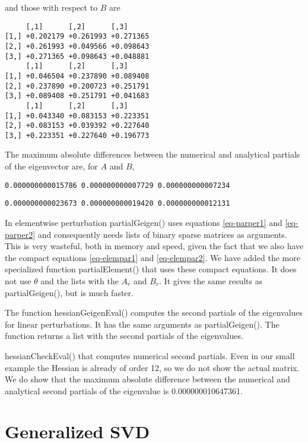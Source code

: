 \documentclass[
  12pt,
  letterpaper,
  DIV=11,
  numbers=noendperiod]{scrartcl}
\newcommand{\sectionbreak}{\clearpage}
\begin{document}
and those with respect to \(B\) are

\begin{verbatim}
     [,1]      [,2]      [,3]     
[1,] +0.202179 +0.261993 +0.271365
[2,] +0.261993 +0.049566 +0.098643
[3,] +0.271365 +0.098643 +0.048881
     [,1]      [,2]      [,3]     
[1,] +0.046504 +0.237890 +0.089408
[2,] +0.237890 +0.200723 +0.251791
[3,] +0.089408 +0.251791 +0.041683
     [,1]      [,2]      [,3]     
[1,] +0.043340 +0.083153 +0.223351
[2,] +0.083153 +0.039392 +0.227640
[3,] +0.223351 +0.227640 +0.196773
\end{verbatim}

The maximum absolute differences between the numerical and analytical
partials of the eigenvector are, for \(A\) and \(B\),

\begin{verbatim}
0.000000000015786 0.000000000007729 0.000000000007234 
\end{verbatim}

\begin{verbatim}
0.000000000023673 0.000000000019420 0.000000000012131 
\end{verbatim}

In elementwise perturbation partialGeigen() uses equations
\eqref{eq-parper1} and \eqref{eq-parper2} and consequently needs lists
of binary sparse matrices as arguments. This is very wasteful, both in
memory and speed, given the fact that we also have the compact equations
\eqref{eq-elempar1} and \eqref{eq-elempar2}. We have added the more
specialized function partialElement() that uses these compact equations.
It does not use \(\theta\) and the lists with the \(A_r\) and \(B_r\).
It gives the same results as partialGeigen(), but is much faster.

The function hessianGeigenEval() computes the second partials of the
eigenvalues for linear perturbations. It has the same arguments as
partialGeigen(). The function returns a list with the second partials of
the eigenvalues.

hessianCheckEval() that computes numerical second partials. Even in our
small example the Hessian is already of order 12, so we do not show the
actual matrix. We do show that the maximum absolute difference between
the numerical and analytical second partials of the eigenvalue is
0.000000010647361.

\sectionbreak

\section{Generalized SVD}\label{sec-GSV}
\end{document}
